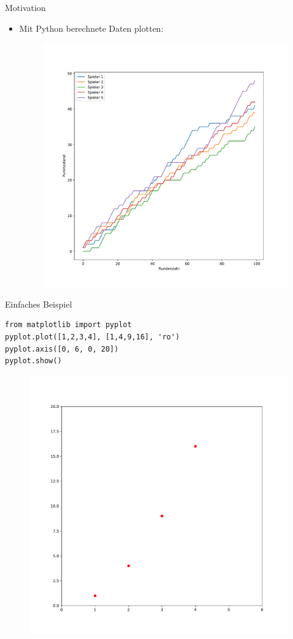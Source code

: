 \begin{frame}{Motivation}
    \begin{itemize}
        \item Mit Python berechnete Daten plotten:
        \begin{figure}[h]
            \includegraphics[width = .7\linewidth]{spielplot}
        \end{figure}
    \end{itemize}
\end{frame}

\begin{frame}[fragile]{Einfaches Beispiel}
    \begin{lstlisting}
from matplotlib import pyplot
pyplot.plot([1,2,3,4], [1,4,9,16], 'ro')
pyplot.axis([0, 6, 0, 20])
pyplot.show()
    \end{lstlisting}

    \begin{figure}[h]
        \includegraphics[width=.5\linewidth]{matplotlib_example1}
    \end{figure}
\end{frame}

